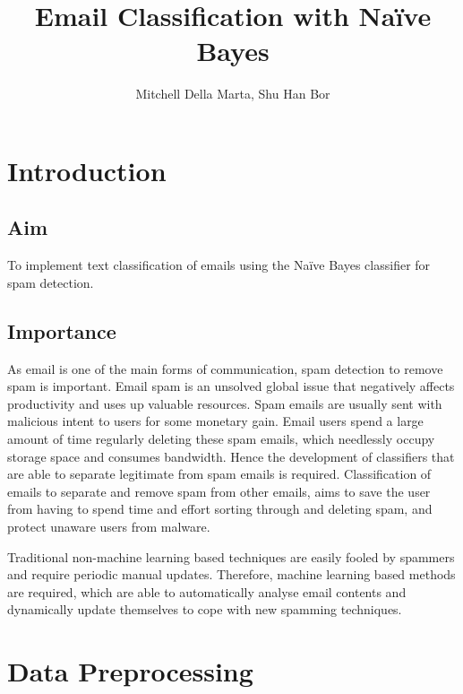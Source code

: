 \documentclass[10pt, a4paper]{article}
\title{Email Classification with Na\"ive Bayes}
\author{Mitchell Della Marta, Shu Han Bor}
\begin{document}
\setlength{\parindent}{0cm}
\setlength{\parskip}{\baselineskip}
\renewcommand\thetable{\Roman{table}}

\maketitle

\section{Introduction}

\subsection{Aim}

To implement text classification of emails using the Na\"ive Bayes classifier for spam detection.

\subsection{Importance}

As email is one of the main forms of communication, spam detection to remove spam is important. Email spam is an unsolved global issue that negatively affects productivity and uses up valuable resources. Spam emails are usually sent with malicious intent to users for some monetary gain. Email users spend a large amount of time regularly deleting these spam emails, which needlessly occupy storage space and consumes bandwidth. Hence the development of classifiers that are able to separate legitimate from spam emails is required. Classification of emails to separate and remove spam from other emails, aims to save the user from having to spend time and effort sorting through and deleting spam, and protect unaware users from malware.

Traditional non-machine learning based techniques are easily fooled by spammers and require periodic manual updates. Therefore, machine learning based methods are required, which are able to automatically analyse email contents and dynamically update themselves to cope with new spamming techniques.

\section{Data Preprocessing}
\end{document}
